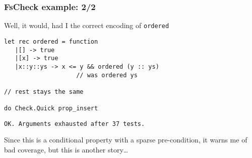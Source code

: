 \documentclass{beamer}
\begin{document}
\begin{frame}[fragile]
  \frametitle{FsCheck example: 2/2}
Well, it would, had I the correct encoding of \texttt{ordered}
  \begin{small}
    \begin{lstlisting}
let rec ordered = function                      
   |[] -> true
   |[x] -> true
   |x::y::ys -> x <= y && ordered (y :: ys) 
                    // was ordered ys  
 
// rest stays the same

do Check.Quick prop_insert
 \end{lstlisting}
  \end{small}
    \begin{small}
    \begin{lstlisting}
OK. Arguments exhausted after 37 tests.
    \end{lstlisting}
  \end{small}
  Since this is a conditional property with a  sparse pre-condition, it
  warns me of bad coverage, but this is another story\dots
\end{frame}







\end{document}
